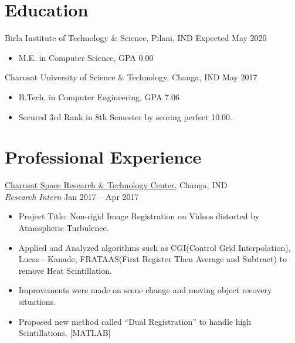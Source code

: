 \documentclass{res}
\begin{document}
\begin{resume}
 
\section{{\Large Education}} 
\vspace{8pt}

{\sc Birla Institute of Technology \& Science}, Pilani, IND \hfill Expected May 2020
\begin{itemize}
\item M.E. in Computer Science, GPA 0.00
\end{itemize}

{\sc Charusat University of Science \& Technology}, Changa, IND \hfill May 2017
\begin{itemize}
\item B.Tech. in Computer Engineering, GPA 7.06
\item Secured 3rd Rank in 8th Semester by scoring perfect 10.00.
\end{itemize}
  
\vspace{0.01in} 
\section{{\Large Professional Experience}} 
\vspace{8pt}

{\sc \underline{Charusat Space Research \& Technology Center}}, Changa, IND\\
{\it Research Intern} \hfill Jan 2017 -- Apr 2017
\begin{itemize}
\item Project Title: Non-rigid Image Registration on Videos distorted by Atmospheric Turbulence.
\item  Applied and Analyzed algorithms such as CGI(Control Grid Interpolation), Lucas - Kanade,
FRATAAS(First Register Then Average and Subtract) to remove Heat Scintillation.
\item Improvements were made on scene change and moving object recovery situations.
\item Proposed new method called ``Dual Registration'' to handle high Scintillations. [MATLAB]
\end{itemize}
 
\vspace{0.01in} 

\end{resume}
\end{document}
